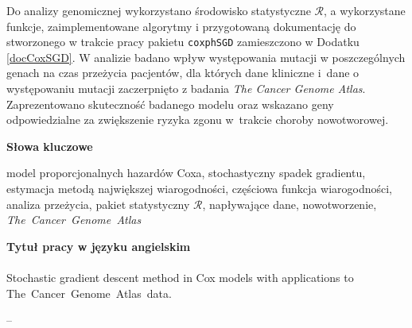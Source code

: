 \documentclass[]{mini}
\begin{document}
Do analizy genomicznej wykorzystano środowisko statystyczne $\mathcal{R}$, a wykorzystane funkcje, zaimplementowane algorytmy i przygotowaną dokumentację do stworzonego w trakcie pracy pakietu \texttt{coxphSGD} zamieszczono w Dodatku \ref{docCoxSGD}. W analizie badano wpływ występowania mutacji w poszczególnych genach na czas przeżycia pacjentów, dla których dane kliniczne i~dane o występowaniu mutacji zaczerpnięto z badania \textit{The Cancer Genome Atlas}. Zaprezentowano skuteczność badanego modelu oraz wskazano geny odpowiedzialne za zwiększenie ryzyka zgonu w~trakcie choroby nowotworowej. \ \\
\begin{center}
\textbf{Słowa kluczowe} 
\end{center}
model proporcjonalnych hazardów Coxa, stochastyczny spadek gradientu, estymacja metodą największej wiarogodności, częściowa funkcja wiarogodności, analiza przeżycia, pakiet statystyczny $\mathcal{R}$, napływające dane, nowotworzenie, \textit{The~Cancer~Genome~Atlas} \ \\
\begin{center}
\textbf{Tytuł pracy w języku angielskim} \\ \ \\ \vspace{-10pt}
Stochastic gradient descent method in Cox models with applications to \\ The~Cancer~Genome~Atlas~data.
\end{center}



\tableofcontents







--





\appendix

%


\small

%


\makestatement
\end{document}
